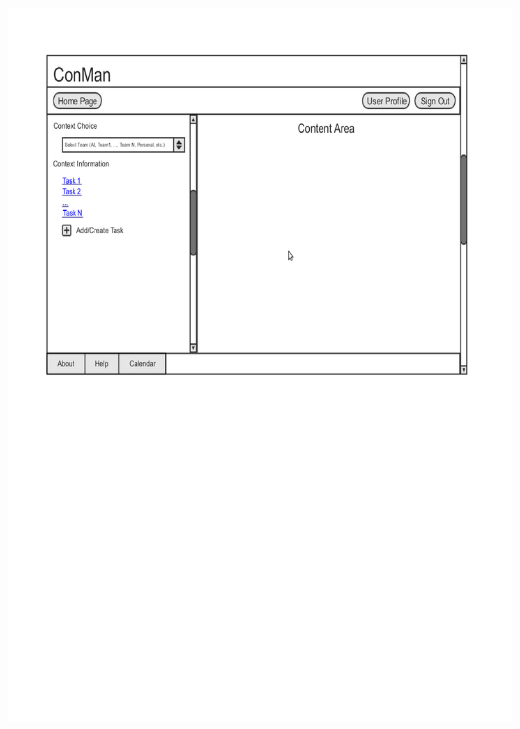 \documentclass{article}
\begin{document}
\begin{center}
\includegraphics[trim = 0cm 5cm 0cm 0cm, clip=true, scale=0.7]{images/mainscreen}
\end{center}
\end{document}
